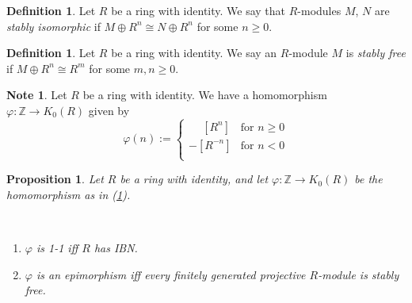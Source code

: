\documentclass[12pt, letterpaper, oneside]{article}
\theoremstyle{plain}
\newtheorem{proposition}[theorem]{Proposition}
\theoremstyle{definition}
\newtheorem{definition}[theorem]{Definition}
\newtheorem{note}[theorem]{Note}
\newcommand{\Z}{{\mathbb Z}}
\newcommand{\benu}{\begin{enumerate}}
\newcommand{\eenu}{\end{enumerate}}
\newcommand{\vs}{\vskip 5mm}
\begin{document}
\vs\vs

\begin{definition}
Let $R$ be a ring with identity.  We say that $R$-modules  $M$, $N$ are \emph{stably isomorphic}
if $M\oplus R^{n} \cong N \oplus R^{n}$ for some $n\geq 0$.
\end{definition}


\vs\vs

\begin{definition}
Let $R$ be a ring with identity.  We say an  $R$-module  $M$ is \emph{stably free}
if $M\oplus R^{n} \cong R^{m}$ for some $m, n\geq 0$.
\end{definition}


\vs\vs

\begin{note}
\label{NOTE_ZKZEROHOMOMOM}
Let $R$ be a ring with identity. We have a homomorphism $\varphi \colon  \Z \to K_{0}(R)$ given by 
$$
\varphi(n) := 
\begin{cases}
\phantom{-}[R^{n}] & \text{for $n\geq 0$} \\
-[R^{-n}] & \text{for $n< 0$} \\
\end{cases}
$$
\end{note}



\vs\vs

\begin{proposition} Let $R$ be a ring with identity, and let $\varphi \colon \Z \to K_{0}(R)$
be the homomorphism as in (\ref{NOTE_ZKZEROHOMOMOM}).

\vskip -13mm

\ 
\benu
\item $\varphi$ is 1-1 iff $R$ has IBN.
\item  $\varphi$ is  an epimorphism iff every finitely generated projective $R$-module is 
stably free.  
\eenu

\end{proposition}
\end{document}
